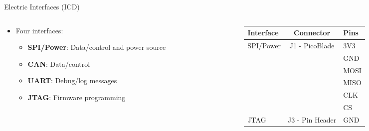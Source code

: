 \begin{frame}{Electric Interfaces (ICD)}

    \begin{columns}[t]
        \begin{column}[t]{0.5\textwidth}
            \begin{itemize}
                \item Four interfaces:
                    \begin{itemize}
                        \item \textbf{SPI/Power}: Data/control and power source
                        \vspace{0.2cm}
                        \item \textbf{CAN}: Data/control
                        \vspace{0.2cm}
                        \item \textbf{UART}: Debug/log messages
                        \vspace{0.2cm}
                        \item \textbf{JTAG}: Firmware programming
                    \end{itemize}
            \end{itemize}
        \end{column}
        \begin{column}[t]{0.6\textwidth}
            \begin{table}[!htb]\tiny
                \centering
                \label{tab:icd}
                \begin{tabular}{lcl}
                    \toprule[1.5pt]
                    \textbf{Interface} & \textbf{Connector} & \textbf{Pins}\\
                    \midrule
                    \multirow{6}{*}{SPI/Power}    & \multirow{6}{*}{J1 - PicoBlade} & 3V3 \\
                                                  &                     & GND \\
                                                  &                     & MOSI \\
                                                  &                     & MISO \\
                                                  &                     & CLK \\
                                                  &                     & CS \\
                    \midrule
                    \multirow{4}{*}{JTAG}         & \multirow{4}{*}{J3 - Pin Header} & GND \\

\end{tabular}
\end{table}
\end{column}
\end{columns}
\end{frame}
